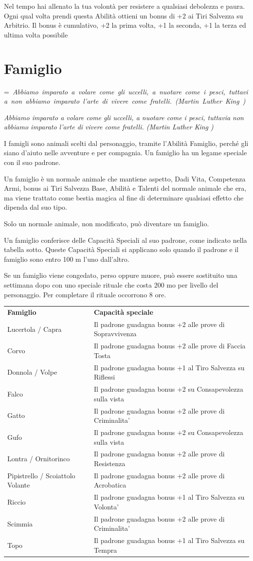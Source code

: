 \documentclass[a4paper,11pt,twoside,openany]{book}
\makeatletter
\newcommand{\mybox}[1]{%
	\setbox0=\hbox{#1}%
	\setlength{\@tempdima}{\dimexpr\wd0+13pt}%
	\begin{tcolorbox}[boxrule=0.5pt,arc=4pt, breakable,enhanced,
		left=6pt,right=6pt,top=6pt,bottom=6pt,boxsep=0pt,width=\@tempdima]
		#1
	\end{tcolorbox}
}
\makeatother
\begin{document}
Nel tempo hai allenato la tua volontà per resistere a qualsiasi debolezza e paura. Ogni qual volta prendi questa Abilità ottieni un bonus di +2 ai Tiri Salvezza su Arbitrio. Il bonus è cumulativo, +2 la prima volta, +1 la seconda, +1 la terza ed ultima volta possibile

\pagebreak

\section{Famiglio}

\label{famiglio}
\mybox{\textit{
Abbiamo imparato a volare come gli uccelli, a nuotare come i pesci, tuttavia non abbiamo imparato l'arte di vivere come fratelli. (Martin Luther King )
}}\medskip

I famigli sono animali scelti dal personaggio, tramite l'Abilità Famiglio, perché gli siano d'aiuto nelle avventure e per compagnia. Un famiglio ha un legame speciale con il suo padrone.

Un famiglio è un normale animale che mantiene aspetto, Dadi Vita, Competenza Armi, bonus ai Tiri Salvezza Base, Abilità e Talenti del normale animale che era, ma viene trattato come bestia magica al fine di determinare qualsiasi effetto che dipenda dal suo tipo. 

Solo un normale animale, non modificato, può diventare un famiglio.

Un famiglio conferisce delle Capacità Speciali al suo padrone, come indicato nella tabella sotto. Queste Capacità Speciali si applicano solo quando il padrone e il famiglio sono entro 100 m l'uno dall'altro.

Se un famiglio viene congedato, perso oppure muore, può essere sostituito una settimana dopo con uno speciale rituale che costa 200 mo per livello del personaggio. Per {\small completare} il rituale occorrono 8 ore.

\bigskip

\begin{tabular}{L{4.5cm} L{11.5cm}}
\toprule
\textbf{Famiglio} & \textbf{Capacità speciale}\tabularnewline
Lucertola / Capra & Il padrone guadagna bonus +2 alle prove di Sopravvivenza\tabularnewline
Corvo & Il padrone guadagna bonus +2 alle prove di Faccia Tosta\tabularnewline
Donnola / Volpe & Il padrone guadagna bonus +1 al Tiro Salvezza su Riflessi\tabularnewline
Falco & Il padrone guadagna bonus +2 su Consapevolezza sulla vista\tabularnewline
Gatto & Il padrone guadagna bonus +2 alle prove di Criminalita'\tabularnewline
Gufo & Il padrone guadagna bonus +2 su Consapevolezza sulla vista\tabularnewline
Lontra / Ornitorinco & Il padrone guadagna bonus +2 alle prove di Resistenza\tabularnewline
Pipistrello / Scoiattolo Volante & Il padrone guadagna bonus +2 alle prove di Acrobatica\tabularnewline
Riccio & Il padrone guadagna bonus +1 al Tiro Salvezza su Volonta'\tabularnewline
Scimmia & Il padrone guadagna bonus +2 alle prove di Criminalita'\tabularnewline
Topo & Il padrone guadagna bonus +1 al Tiro Salvezza su Tempra\tabularnewline
\end{tabular}
\end{document}
